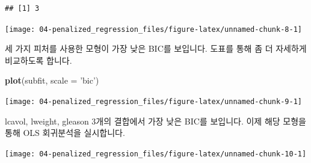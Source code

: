 \documentclass[12pt,]{book}
\newenvironment{Shaded}{\begin{snugshade}}{\end{snugshade}}
\newcommand{\DataTypeTok}[1]{\textcolor[rgb]{0.13,0.29,0.53}{#1}}
\newcommand{\KeywordTok}[1]{\textcolor[rgb]{0.13,0.29,0.53}{\textbf{#1}}}
\newcommand{\NormalTok}[1]{#1}
\newcommand{\OperatorTok}[1]{\textcolor[rgb]{0.81,0.36,0.00}{\textbf{#1}}}
\newcommand{\StringTok}[1]{\textcolor[rgb]{0.31,0.60,0.02}{#1}}
\begin{document}
\begin{verbatim}
## [1] 3
\end{verbatim}

\begin{Shaded}
\end{Shaded}

\begin{center}\texttt{[image: 04-penalized\_regression\_files/figure-latex/unnamed-chunk-8-1]} \end{center}

세 가지 피처를 사용한 모형이 가장 낮은 BIC를 보입니다. 도표를 통해 좀 더 자세하게 비교하도록 합니다.

\begin{Shaded}
\begin{Highlighting}[]
\KeywordTok{plot}\NormalTok{(subfit, }\DataTypeTok{scale =} \StringTok{'bic'}\NormalTok{)}
\end{Highlighting}
\end{Shaded}

\begin{center}\texttt{[image: 04-penalized\_regression\_files/figure-latex/unnamed-chunk-9-1]} \end{center}

lcavol, lweight, gleason 3개의 결합에서 가장 낮은 BIC를 보입니다. 이제 해당 모형을 통해 OLS 회귀분석을 실시합니다.

\begin{Shaded}
\end{Shaded}

\begin{center}\texttt{[image: 04-penalized\_regression\_files/figure-latex/unnamed-chunk-10-1]} \end{center}
\end{document}
